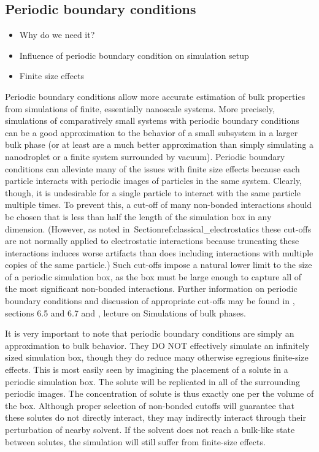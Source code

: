 \documentclass[9pt,bestpractices]{livecoms}
\begin{document}
\subsection{Periodic boundary conditions}
\label{sec:periodic}
\begin{itemize}
\item Why do we need it?
\item Influence of periodic boundary condition on simulation setup
\item Finite size effects
\end{itemize}


Periodic boundary conditions allow more accurate estimation of bulk properties
from simulations of finite, essentially nanoscale systems.  More precisely,
simulations of comparatively small systems with periodic boundary conditions can
be a good approximation to the   behavior of a small subsystem in a larger bulk
phase (or at least are a much better approximation than simply simulating a
nanodroplet or a finite system surrounded by vacuum).  Periodic boundary
conditions can alleviate many of the issues with finite size effects because
each particle interacts with periodic images of particles in the same system.
Clearly, though, it is undesirable for a single particle to interact with the
same particle multiple times.  To prevent this, a cut-off of many non-bonded
interactions should be chosen that is less than half the length of the
simulation box in any dimension.  (However, as noted
in~Section{ref:classical_electrostatics} these cut-offs are not normally applied
to electrostatic interactions because truncating these interactions induces
worse artifacts than does including interactions with multiple copies of the
same particle.) Such cut-offs impose a natural lower limit to the size of a
periodic simulation box, as the box must be large enough to capture all of the
most significant non-bonded interactions.  Further information on periodic
boundary conditions and discussion of appropriate cut-offs may be found in
\citet{LeachBook}, sections 6.5 and 6.7 and \citet{ShellNotes}, lecture on
Simulations of bulk phases.

It is very important to note that periodic boundary conditions are simply an
approximation to bulk behavior.  They DO NOT effectively simulate an infinitely
sized simulation box, though they do reduce many otherwise egregious finite-size
effects.  This is most easily seen by imagining the placement of a solute in a
periodic simulation box.  The solute will be replicated in all of the
surrounding periodic images.  The concentration of solute is thus exactly one
per the volume of the box.  Although proper selection of non-bonded cutoffs will
guarantee that these solutes do not directly interact, they may indirectly
interact through their perturbation of nearby solvent.  If the solvent does not
reach a bulk-like state between solutes, the simulation will still suffer from
finite-size effects.
\end{document}
